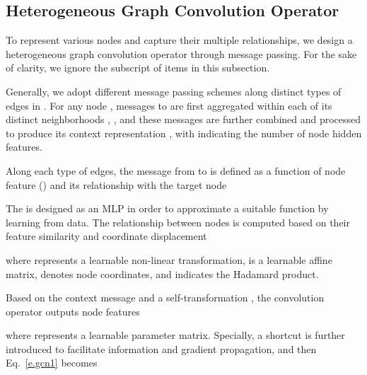 \documentclass[letterpaper, 10 pt, conference]{ieeeconf}
\begin{document}
\subsection{Heterogeneous Graph Convolution Operator}
\label{sec.gcn}
To represent various nodes and capture their multiple relationships, we design a heterogeneous graph convolution operator through message passing. For the sake of clarity, we ignore the subscript  of items in this subsection.

Generally,  we adopt different message passing schemes along distinct types of edges in . For any node , messages  to   are first aggregated  within each of its distinct neighborhoods , , and these messages are further combined and processed to produce its context representation , with  indicating the number of node hidden features.

Along each type of edges, the message from  to  is defined as a function of node feature  () and its relationship  with the target node

The  is designed  as an MLP in order to  approximate a suitable function by learning from data.  The relationship  between nodes is computed based on their feature similarity and coordinate displacement

where  represents a learnable non-linear transformation,  is a learnable affine matrix,  denotes node coordinates, and  indicates the Hadamard product. 

Based on the context message  and a self-transformation ,
the convolution operator outputs node features

where  represents a learnable parameter matrix.
Specially, a shortcut is further introduced to facilitate information and gradient propagation, and then Eq.~\eqref{e.gcn1} becomes
\end{document}
